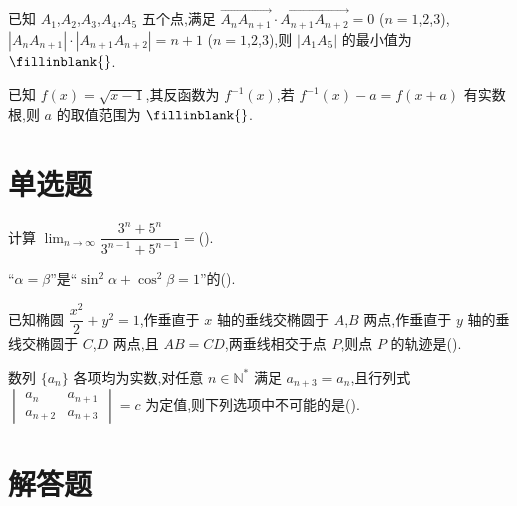 \begin{problem}
已知 \(A_1\),\(A_2\),\(A_3\),\(A_4\),\(A_5\) 五个点,满足 \(\overrightarrow{A_nA_{n+1}}\cdot\overrightarrow{A_{n+1}A_{n+2}}=0\) (\(n=1\),\(2\),\(3\)),\(|A_nA_{n+1}|\cdot|A_{n+1}A_{n+2}|=n+1\) (\(n=1\),\(2\),\(3\)),则 \(|A_1A_5|\) 的最小值为 \(\fillinblank{}\).
\end{problem}

\begin{problem}
已知 \(f(x)=\sqrt{x-1}\),其反函数为 \(f^{-1}(x)\),若 \(f^{-1}(x)-a=f(x+a)\) 有实数根,则 \(a\) 的取值范围为 \(\fillinblank{}\).
\end{problem}

\section{单选题}

\begin{problem}
计算 \(\displaystyle\lim_{n\to\infty}\dfrac{3^n+5^n}{3^{n-1}+5^{n-1}}=\)(\quad).

\end{problem}

\begin{problem}
``\(\alpha=\beta\)''是``\(\sin^2\alpha+\cos^2\beta=1\)''的(\quad).

\end{problem}

\begin{problem}
已知椭圆 \(\dfrac{x^2}{2}+y^2=1\),作垂直于 \(x\) 轴的垂线交椭圆于 \(A\),\(B\) 两点,作垂直于 \(y\) 轴的垂线交椭圆于 \(C\),\(D\) 两点,且 \(AB=CD\),两垂线相交于点 \(P\),则点 \(P\) 的轨迹是(\quad).

\end{problem}

\begin{problem}
数列 \(\{a_n\}\) 各项均为实数,对任意 \(n\in\mathbb N^*\) 满足 \(a_{n+3}=a_n\),且行列式 \(\begin{vmatrix}a_n&a_{n+1}\\a_{n+2}&a_{n+3}\end{vmatrix}=c\) 为定值,则下列选项中不可能的是(\quad).

\end{problem}

\section{解答题}

